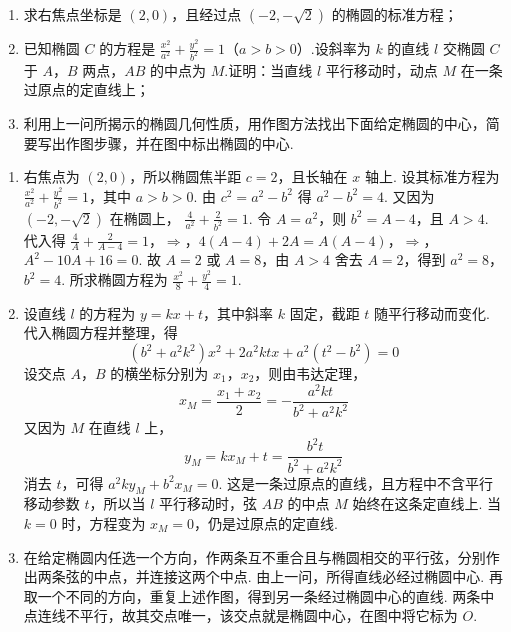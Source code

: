 \begin{problem}
\begin{enumerate}
\item 求右焦点坐标是 \((2,0)\)，且经过点 \((-2, -\sqrt{2})\) 的椭圆的标准方程；
\item 已知椭圆 \(C\) 的方程是 \(\frac{x^2}{a^2} + \frac{y^2}{b^2} = 1\)（\(a > b > 0\)）.设斜率为 \(k\) 的直线 \(l\) 交椭圆 \(C\) 于 \(A\)，\(B\) 两点，\(AB\) 的中点为 \(M\).证明：当直线 \(l\) 平行移动时，动点 \(M\) 在一条过原点的定直线上；
\item 利用上一问所揭示的椭圆几何性质，用作图方法找出下面给定椭圆的中心，简要写出作图步骤，并在图中标出椭圆的中心.
\end{enumerate}

\end{problem}

\begin{solution}
\begin{enumerate}
\item 右焦点为 \((2,0)\)，所以椭圆焦半距 \(c=2\)，且长轴在 \(x\) 轴上. 设其标准方程为
\(\displaystyle\frac{x^2}{a^2}+\frac{y^2}{b^2}=1\)，其中 \(a > b > 0\). 由
\(c^2=a^2-b^2\) 得 \(a^2-b^2=4\).
又因为 \((-2,-\sqrt2)\) 在椭圆上，
\(\displaystyle\frac4{a^2}+\frac2{b^2}=1\). 令 \(A=a^2\)，则
\(b^2=A-4\)，且 \(A>4\). 代入得
\(\frac4A+\frac2{A-4}=1\)，\(\Longrightarrow\)，\(4(A-4)+2A=A(A-4)\)，\(\Longrightarrow\)，\(A^2-10A+16=0\).
故 \(A=2\) 或 \(A=8\)，由 \(A>4\) 舍去 \(A=2\)，得到
\(a^2=8\)，\(b^2=4\). 所求椭圆方程为
\(\displaystyle\frac{x^2}{8}+\frac{y^2}{4}=1\).

\item 设直线 \(l\) 的方程为 \(y=kx+t\)，其中斜率 \(k\) 固定，截距 \(t\) 随平行移动而变化. 代入椭圆方程并整理，得
\[
(b^2+a^2k^2)x^2+2a^2ktx+a^2(t^2-b^2)=0
\]
设交点 \(A\)，\(B\) 的横坐标分别为 \(x_1\)，\(x_2\)，则由韦达定理，
\[
x_M=\frac{x_1+x_2}{2}
=-\frac{a^2kt}{b^2+a^2k^2}
\]
又因为 \(M\) 在直线 \(l\) 上，
\[
y_M=kx_M+t
=\frac{b^2t}{b^2+a^2k^2}
\]
消去 \(t\)，可得 \(a^2k y_M+b^2x_M=0\). 这是一条过原点的直线，且方程中不含平行移动参数 \(t\)，所以当 \(l\) 平行移动时，弦 \(AB\) 的中点 \(M\) 始终在这条定直线上. 当 \(k=0\) 时，方程变为 \(x_M=0\)，仍是过原点的定直线.

\item 在给定椭圆内任选一个方向，作两条互不重合且与椭圆相交的平行弦，分别作出两条弦的中点，并连接这两个中点. 由上一问，所得直线必经过椭圆中心. 再取一个不同的方向，重复上述作图，得到另一条经过椭圆中心的直线. 两条中点连线不平行，故其交点唯一，该交点就是椭圆中心，在图中将它标为 \(O\).
\end{enumerate}
\end{solution}
